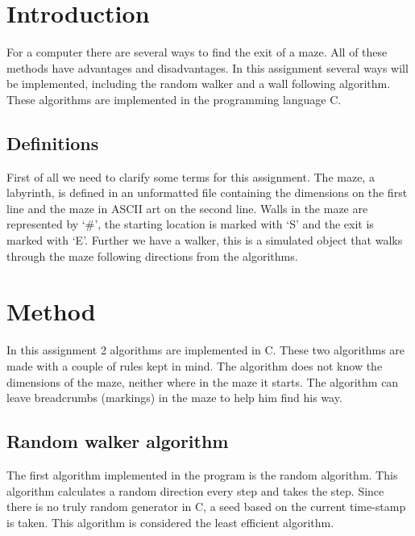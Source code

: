 \documentclass[a4paper,12pt]{article}
\begin{document}


\section{Introduction}
For a computer there are several ways to find the exit of a maze. All of these methods have advantages and disadvantages. In this assignment several ways will be implemented, including the random walker and a wall following algorithm. These algorithms are implemented in the programming language C.

\subsection{Definitions}
First of all we need to clarify some terms for this assignment. The maze, a labyrinth, is defined in an  unformatted file containing the dimensions on the first line and the maze in ASCII art on the second line. Walls in the maze are represented by `\#', the starting location is marked with `S' and the exit is marked with `E'. Further we have a walker, this is a simulated object that walks through the maze following directions from the algorithms.


\section{Method}
In this assignment 2 algorithms are implemented in C. These two algorithms are made with a couple of rules kept in mind. The algorithm does not know the dimensions of the maze, neither where in the maze it starts. The algorithm can leave breadcrumbs (markings) in the maze to help him find his way.

\subsection{Random walker algorithm}
The first algorithm implemented in the program is the random algorithm. This algorithm calculates a random direction every step and takes the step. Since there is no truly random generator in C, a seed based on the current time-stamp is taken. This algorithm is considered the least efficient algorithm.
\end{document}
